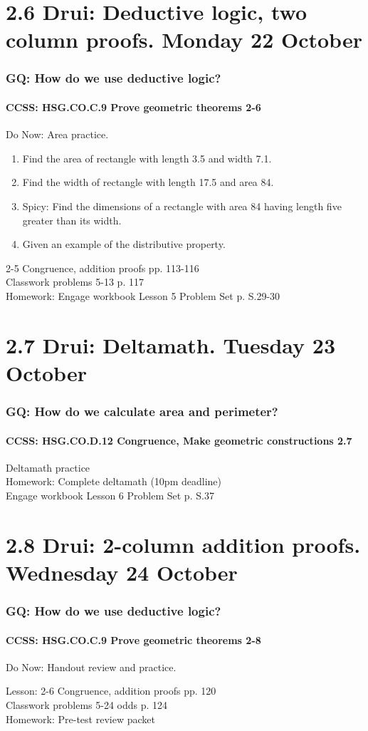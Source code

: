 \documentclass{beamer}
\begin{document}
\section{2.6 Drui: Deductive logic, two column proofs. Monday 22 October}
  \frame
  {
    \frametitle{GQ: How do we use deductive logic?}
    \framesubtitle{CCSS: HSG.CO.C.9 Prove geometric theorems  \alert{2-6}}

    \begin{block}{Do Now: Area practice.}
    \begin{enumerate}
        \item Find the area of rectangle with length 3.5 and width 7.1.
        \item Find the width of rectangle with length 17.5 and area 84.
        \item Spicy: Find the dimensions of a rectangle with area 84 having length five greater than its width.
        \item Given an example of the distributive property.
    \end{enumerate}
    \end{block}
    2-5 Congruence, addition proofs  pp. 113-116\\
    Classwork problems 5-13 p. 117\\
    \vspace{0.5cm}
    Homework: Engage workbook Lesson 5 Problem Set p. S.29-30
  }

\section{2.7 Drui: Deltamath. Tuesday 23 October}
  \frame
  {
    \frametitle{GQ: How do we calculate area and perimeter?}
    \framesubtitle{CCSS: HSG.CO.D.12 Congruence, Make geometric constructions  \alert{2.7}}

    Deltamath practice\\ \bigskip
    Homework: Complete deltamath (10pm deadline)\\
    Engage workbook Lesson 6 Problem Set p. S.37
  }

\section{2.8 Drui: 2-column addition proofs. Wednesday 24 October}
  \frame
  {
    \frametitle{GQ: How do we use deductive logic?}
    \framesubtitle{CCSS: HSG.CO.C.9 Prove geometric theorems  \alert{2-8}}

    \begin{block}{Do Now: Handout review and practice.}
    \end{block}
    Lesson: 2-6 Congruence, addition proofs  pp. 120\\
    Classwork problems 5-24 odds p. 124\\
    \vspace{0.5cm}
    Homework: Pre-test review packet
  }
\end{document}
